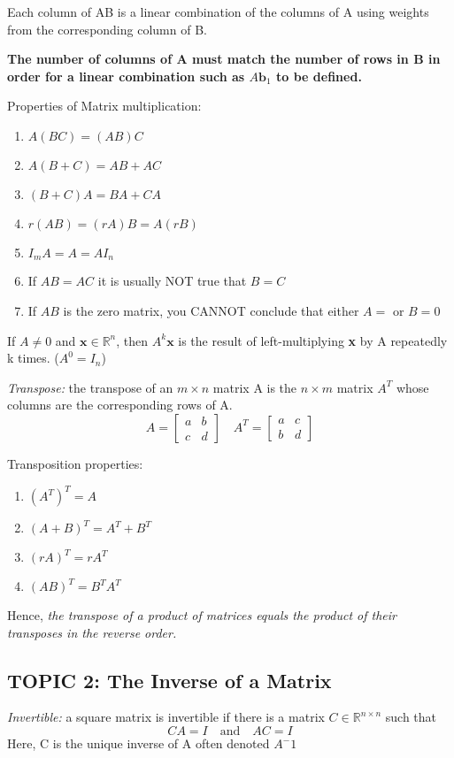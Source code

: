 \documentclass[12pt]{article} %
\newcommand{\R}{\mathbb{R}}
\begin{document}
Each column of AB is a linear combination of the columns of A using weights from the corresponding column of B. 

\textbf{The number of columns of A must match the number of rows in B in order for a linear combination such as $A\mathbf{b}_1$ to be defined.}

Properties of Matrix multiplication:
\begin{enumerate}
	\item $A(BC) = (AB)C$
	\item $A(B + C) = AB + AC$
	\item $(B + C)A = BA + CA$
	\item $r(AB) = (rA)B = A(rB)$
	\item $I_mA = A = AI_n$
	\item If $AB = AC$ it is usually NOT true that $B = C$
	\item If $AB$ is the zero matrix, you CANNOT conclude that either $A = $  or $B = 0$
\end{enumerate}

If $A \neq 0$ and $\mathbf{x} \in \R^n$, then $A^k\mathbf{x}$ is the result of left-multiplying \textbf{x} by A repeatedly k times. ($A^0 = I_n$)

\emph{Transpose:} the transpose of an $m \times n$ matrix A is the $n \times m$ matrix $A^T$ whose columns are the corresponding rows of A.
$$A = \begin{bmatrix}
	a & b\\
	c & d
\end{bmatrix} \quad A^T = \begin{bmatrix}
	a & c\\
	b & d
\end{bmatrix}$$

Transposition properties:
\begin{enumerate}
	\item $(A^T)^T = A$
	\item $(A + B)^T = A^T + B^T$
	\item $(rA)^T = rA^T$
	\item $(AB)^T = B^TA^T$
\end{enumerate}

Hence, \textit{the transpose of a product of matrices equals the product of their transposes in the reverse order.}

\pagebreak
\subsection{TOPIC 2: The Inverse of a Matrix}
\emph{Invertible:} a square matrix is invertible if there is a matrix $C \in \R^{n \times n}$ such that 
$$CA = I \quad \text{and} \quad AC = I$$
Here, C is the unique inverse of A often denoted $A^-1$
\end{document}
